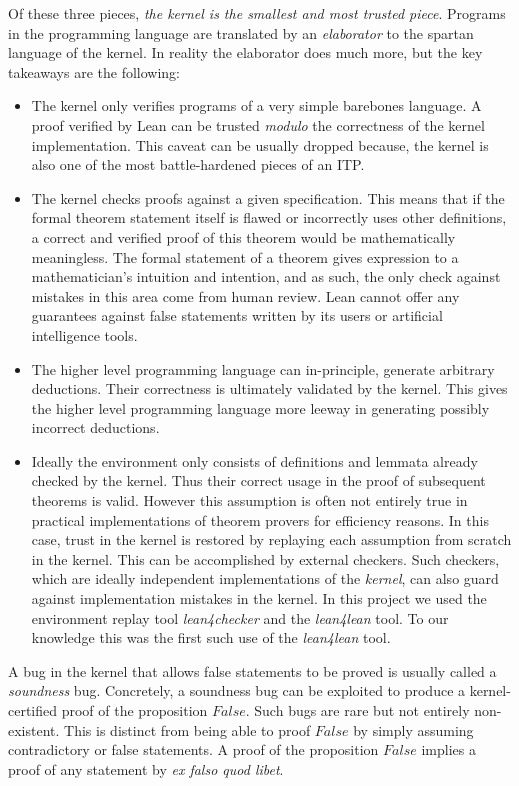 Of these three pieces, \emph{the kernel is the smallest and most trusted piece}. Programs in the programming language are translated by an \emph{elaborator} to the spartan language of the kernel. In reality the elaborator does much more, but the key takeaways are the following:
\begin{itemize}
    \item The kernel only verifies programs of a very simple barebones language. A proof verified by Lean can be trusted \emph{modulo} the correctness of the kernel implementation. This caveat can be usually dropped because, the kernel is also one of the most battle-hardened pieces of an ITP.
    \item The kernel checks proofs against a given specification. This means that if the formal theorem statement itself is flawed or incorrectly uses other definitions, a correct and verified proof of this theorem would be mathematically meaningless. The formal statement of a theorem gives expression to a mathematician's intuition and intention, and as such, the only check against mistakes in this area come from human review. Lean cannot offer any guarantees against false statements written by its users or artificial intelligence tools.
    \item The higher level programming language can in-principle, generate arbitrary deductions. Their correctness is ultimately validated by the kernel. This gives the higher level programming language more leeway in generating possibly incorrect deductions.
    \item Ideally the environment only consists of definitions and lemmata already checked by the kernel. Thus their correct usage in the proof of subsequent theorems is valid. However this assumption is often not entirely true in practical implementations of theorem provers for efficiency reasons. In this case, trust in the kernel is restored by replaying each assumption from scratch in the kernel. This can be accomplished by external checkers. Such checkers, which are ideally independent implementations of the \emph{kernel}, can also guard against implementation mistakes in the kernel. In this project we used the environment replay tool \textit{lean4checker} and the \textit{lean4lean} \cite{lean4lean} tool. To our knowledge this was the first such use of the \textit{lean4lean} tool.

\end{itemize}

\begin{remark}
    A bug in the kernel that allows false statements to be proved is usually called a \emph{soundness} bug. Concretely, a soundness bug can be exploited to produce a kernel-certified proof of the proposition $False$. Such bugs are rare but not entirely non-existent. This is distinct from being able to proof $False$ by simply assuming contradictory or false statements. A proof of the proposition $False$ implies a proof of any statement by \emph{ex falso quod libet}.
\end{remark}


